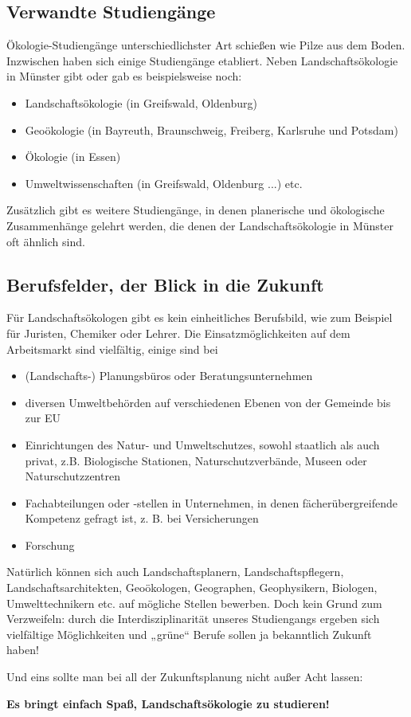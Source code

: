 \subsection*{Verwandte Studiengänge}
Ökologie-Studiengänge unterschiedlichster Art schießen wie Pilze aus dem Boden. Inzwischen haben sich einige Studiengänge etabliert. Neben Landschaftsökologie in Münster gibt oder gab es beispielsweise noch:
\begin{itemize}
  \item Landschaftsökologie (in Greifswald, Oldenburg)
  \item Geoökologie (in Bayreuth, Braunschweig, Freiberg, Karlsruhe und Potsdam)
  \item Ökologie (in Essen)
  \item Umweltwissenschaften (in Greifswald, Oldenburg ...) etc.
\end{itemize}
Zusätzlich gibt es weitere Studiengänge, in denen planerische und ökologische Zusammenhänge gelehrt werden, die denen der Landschaftsökologie in Münster oft ähnlich sind. 

\subsection*{Berufsfelder, der Blick in die Zukunft}
Für Landschaftsökologen gibt es kein einheitliches Berufsbild, wie zum Beispiel für Juristen, Chemiker oder Lehrer. Die Einsatzmöglichkeiten auf dem Arbeitsmarkt sind vielfältig, einige sind bei
\begin{itemize}
  \item (Landschafts-) Planungsbüros oder Beratungsunternehmen
  \item diversen Umweltbehörden auf verschiedenen Ebenen von der Gemeinde bis zur EU
  \item Einrichtungen des Natur- und Umweltschutzes, sowohl staatlich als auch privat, z.B. Biologische Stationen, Naturschutzverbände, Museen oder Naturschutzzentren
  \item Fachabteilungen oder -stellen in Unternehmen, in denen fächerübergreifende Kompetenz gefragt ist, z. B. bei Versicherungen
  \item{Forschung}
\end{itemize}
Natürlich können sich auch Landschaftsplanern, Landschaftspﬂegern,\\ Landschaftsarchitekten, Geoökologen, Geographen, Geophysikern, Biologen, Umwelttechnikern etc. auf mögliche Stellen bewerben. Doch kein Grund zum Verzweifeln: durch die Interdisziplinarität unseres Studiengangs ergeben sich vielfältige Möglichkeiten und „grüne“ Berufe sollen ja bekanntlich Zukunft haben!

Und eins sollte man bei all der Zukunftsplanung nicht außer Acht lassen: 

\textbf{Es bringt einfach Spaß, Landschaftsökologie zu studieren!}
